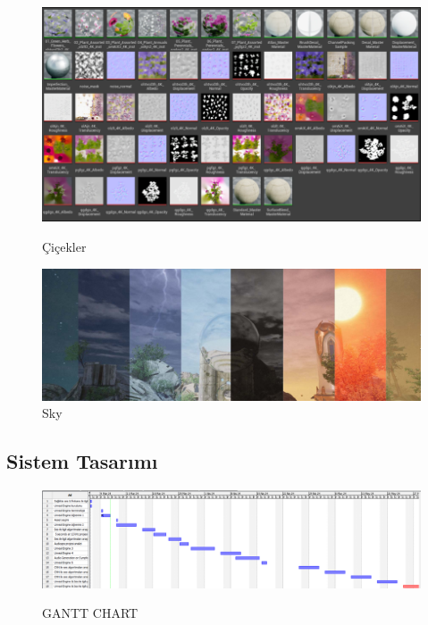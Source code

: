 \documentclass[12pt, a4paper]{article}
\begin{document}
		\begin{figure}[!ht]%
		\begin{minipage}{0.48\textwidth}
			\centering
			\includegraphics[width=.7\linewidth]{flower1.png}
		\caption{Çiçekler}\label{Fig:Data7}
		\end{minipage}\hfill
		\begin{minipage}{0.48\textwidth}
			\centering
			\includegraphics[width=.7\linewidth]{sky.png}
		\caption{Sky}\label{Fig:Data8}
		\end{minipage}
	\end{figure}
	
	\newpage
	\begin{landscape}
		\subsection{Sistem Tasarımı}
		\begin{figure}[!ht]%
			\caption{GANTT CHART}
			\centering
			\includegraphics[height= 5 cm]{sound_gantt_chart1.png}
			\label{gantt}
		\end{figure}
	\end{landscape}
	\newpage
\end{document}
